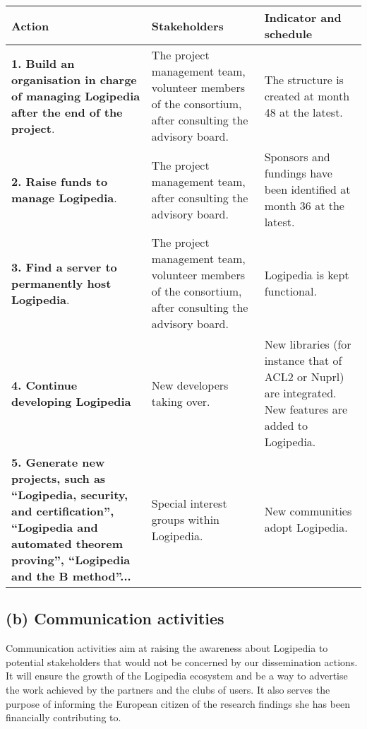 \begin{longtable*}{|p{0.30\textwidth}|p{0.30\textwidth}|p{0.30\textwidth}|}
\hline
{\bf Action}
&
{\bf Stakeholders}
&
{\bf Indicator and schedule}
\\
\hline
{\bf 1. Build an organisation in charge of managing Logipedia
after the end of the project}.
&
The project management team, volunteer members of the consortium,
after consulting the advisory board.
&
The structure is created at month 48 at the latest.
\\
\hline
{\bf 2. Raise funds to manage Logipedia}.
&
The project management team, after consulting the advisory board.
&
Sponsors and fundings have been identified at month 36 at the latest.
\\
\hline   
{\bf 3. Find a server to permanently host Logipedia}.
&
The project management team, volunteer members of the consortium,
after consulting the advisory board.
&
Logipedia is kept functional.
\\
\hline
{\bf 4. Continue developing Logipedia}
&
New developers taking over.
&
New libraries (for instance that of ACL2 or Nuprl) are integrated.
New features are added to Logipedia.
\\
\hline
{\bf 5. Generate new projects, such as ``Logipedia, security, and
certification'', ``Logipedia and automated theorem proving'',
``Logipedia and the B method''...}
&
Special interest groups within Logipedia. 
&
New communities adopt Logipedia.
\\
\hline
\end{longtable*}

\subsection*{(b) Communication activities}

Communication activities aim at raising the awareness about Logipedia
to potential stakeholders that would not be concerned by our
dissemination actions. It will ensure the growth of the Logipedia
ecosystem and be a way to advertise the work achieved by the partners
and the clubs of users. It also serves the purpose of informing the
European citizen of the research findings she has been financially
contributing to.


